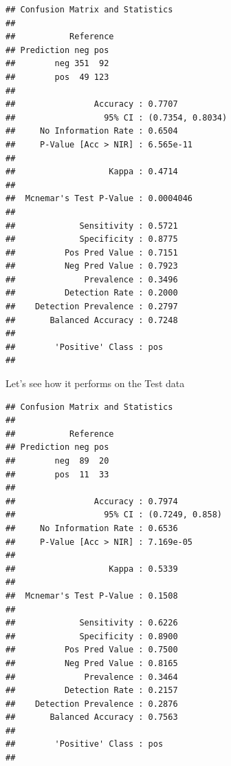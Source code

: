 \documentclass[
]{book}
\newenvironment{Shaded}{\begin{snugshade}}{\end{snugshade}}
\newcommand{\DataTypeTok}[1]{\textcolor[rgb]{0.13,0.29,0.53}{#1}}
\newcommand{\KeywordTok}[1]{\textcolor[rgb]{0.13,0.29,0.53}{\textbf{#1}}}
\newcommand{\NormalTok}[1]{#1}
\newcommand{\OperatorTok}[1]{\textcolor[rgb]{0.81,0.36,0.00}{\textbf{#1}}}
\newcommand{\StringTok}[1]{\textcolor[rgb]{0.31,0.60,0.02}{#1}}
\begin{document}
\begin{verbatim}
## Confusion Matrix and Statistics
## 
##           Reference
## Prediction neg pos
##        neg 351  92
##        pos  49 123
##                                           
##                Accuracy : 0.7707          
##                  95% CI : (0.7354, 0.8034)
##     No Information Rate : 0.6504          
##     P-Value [Acc > NIR] : 6.565e-11       
##                                           
##                   Kappa : 0.4714          
##                                           
##  Mcnemar's Test P-Value : 0.0004046       
##                                           
##             Sensitivity : 0.5721          
##             Specificity : 0.8775          
##          Pos Pred Value : 0.7151          
##          Neg Pred Value : 0.7923          
##              Prevalence : 0.3496          
##          Detection Rate : 0.2000          
##    Detection Prevalence : 0.2797          
##       Balanced Accuracy : 0.7248          
##                                           
##        'Positive' Class : pos             
## 
\end{verbatim}

Let's see how it performs on the Test data

\begin{Shaded}
\end{Shaded}

\begin{verbatim}
## Confusion Matrix and Statistics
## 
##           Reference
## Prediction neg pos
##        neg  89  20
##        pos  11  33
##                                          
##                Accuracy : 0.7974         
##                  95% CI : (0.7249, 0.858)
##     No Information Rate : 0.6536         
##     P-Value [Acc > NIR] : 7.169e-05      
##                                          
##                   Kappa : 0.5339         
##                                          
##  Mcnemar's Test P-Value : 0.1508         
##                                          
##             Sensitivity : 0.6226         
##             Specificity : 0.8900         
##          Pos Pred Value : 0.7500         
##          Neg Pred Value : 0.8165         
##              Prevalence : 0.3464         
##          Detection Rate : 0.2157         
##    Detection Prevalence : 0.2876         
##       Balanced Accuracy : 0.7563         
##                                          
##        'Positive' Class : pos            
## 
\end{verbatim}
\end{document}
